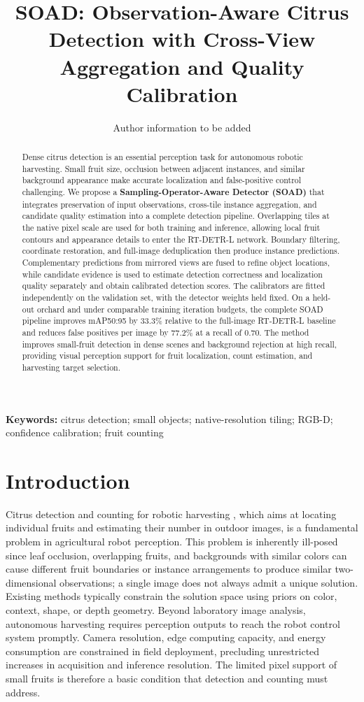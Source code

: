 \documentclass[11pt,a4paper]{article}
\title{SOAD: Observation-Aware Citrus Detection with Cross-View Aggregation and Quality Calibration}
\author{Author information to be added}
\date{}
\begin{document}
\maketitle

\begin{abstract}
Dense citrus detection is an essential perception task for autonomous robotic harvesting. Small fruit size, occlusion between adjacent instances, and similar background appearance make accurate localization and false-positive control challenging. We propose a \textbf{Sampling-Operator-Aware Detector (SOAD)} that integrates preservation of input observations, cross-tile instance aggregation, and candidate quality estimation into a complete detection pipeline. Overlapping tiles at the native pixel scale are used for both training and inference, allowing local fruit contours and appearance details to enter the RT-DETR-L network. Boundary filtering, coordinate restoration, and full-image deduplication then produce instance predictions. Complementary predictions from mirrored views are fused to refine object locations, while candidate evidence is used to estimate detection correctness and localization quality separately and obtain calibrated detection scores. The calibrators are fitted independently on the validation set, with the detector weights held fixed. On a held-out orchard and under comparable training iteration budgets, the complete SOAD pipeline improves mAP50:95 by 33.3\% relative to the full-image RT-DETR-L baseline and reduces false positives per image by 77.2\% at a recall of 0.70. The method improves small-fruit detection in dense scenes and background rejection at high recall, providing visual perception support for fruit localization, count estimation, and harvesting target selection.
\end{abstract}
\textbf{Keywords:} citrus detection; small objects; native-resolution tiling; RGB-D; confidence calibration; fruit counting

\section{Introduction}
Citrus detection and counting for robotic harvesting \cite{agyolo,mfaf,geosphere}, which aims at locating individual fruits and estimating their number in outdoor images, is a fundamental problem in agricultural robot perception. This problem is inherently ill-posed since leaf occlusion, overlapping fruits, and backgrounds with similar colors can cause different fruit boundaries or instance arrangements to produce similar two-dimensional observations; a single image does not always admit a unique solution. Existing methods typically constrain the solution space using priors on color, context, shape, or depth geometry. Beyond laboratory image analysis, autonomous harvesting requires perception outputs to reach the robot control system promptly. Camera resolution, edge computing capacity, and energy consumption are constrained in field deployment, precluding unrestricted increases in acquisition and inference resolution. The limited pixel support of small fruits is therefore a basic condition that detection and counting must address.
\end{document}

